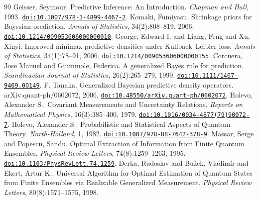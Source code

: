 \documentclass[journal]{IEEEtran}
\begin{document}
\begin{thebibliography}{99}
Geisser, Seymour.
\newblock Predictive Inference: An Introduction.
\newblock \emph{Chapman and Hall}, 1993.  
\newblock \href{https://doi.org/10.1007/978-1-4899-4467-2}{\texttt{doi:10.1007/978-1-4899-4467-2}}.  
Komaki, Fumiyasu.
\newblock Shrinkage priors for Bayesian prediction.
\newblock \emph{Annals of Statistics}, 34(2):808--819, 2006.  
\newblock \href{https://doi.org/10.1214/009053606000000010}{\texttt{doi:10.1214/009053606000000010}}.  
George, Edward I. and Liang, Feng and Xu, Xinyi.
\newblock Improved minimax predictive densities under Kullback--Leibler loss.
\newblock \emph{Annals of Statistics}, 34(1):78--91, 2006.  
\newblock \href{https://doi.org/10.1214/009053606000000155}{\texttt{doi:10.1214/009053606000000155}}.  
Corcuera, Jose Manuel and Giummole, Federica.
\newblock A generalized Bayes rule for prediction.
\newblock \emph{Scandinavian Journal of Statistics}, 26(2):265--279, 1999.  
\newblock \href{https://doi.org/10.1111/1467-9469.00149}{\texttt{doi:10.1111/1467-9469.00149}}.  
F. Tanaka.
\newblock Generalized Bayesian predictive density operators.
\newblock arXiv:quant-ph/0602072, 2006.  
\newblock \href{https://doi.org/10.48550/arXiv.quant-ph/0602072}{\texttt{doi:10.48550/arXiv.quant-ph/0602072}}.  
Holevo, Alexander S..
\newblock Covariant Measurements and Uncertainty Relations.
\newblock \emph{Reports on Mathematical Physics}, 16(3):385--400, 1979.  
\newblock \href{https://doi.org/10.1016/0034-4877(79)90072-7}{\texttt{doi:10.1016/0034-4877(79)90072-7}}.  
Holevo, Alexander S..
\newblock Probabilistic and Statistical Aspects of Quantum Theory.
\newblock \emph{North-Holland}, 1, 1982.  
\newblock \href{https://doi.org/10.1007/978-88-7642-378-9}{\texttt{doi:10.1007/978-88-7642-378-9}}.  
Massar, Serge and Popescu, Sandu.
\newblock Optimal Extraction of Information from Finite Quantum Ensembles.
\newblock \emph{Physical Review Letters}, 74(8):1259--1263, 1995.  
\newblock \href{https://doi.org/10.1103/PhysRevLett.74.1259}{\texttt{doi:10.1103/PhysRevLett.74.1259}}.  
Derka, Radoslav and Bu\v{z}ek, Vladim\'{i}r and Ekert, Artur K..
\newblock Universal Algorithm for Optimal Estimation of Quantum States from Finite Ensembles via Realizable Generalized Measurement.
\newblock \emph{Physical Review Letters}, 80(8):1571--1575, 1998.  

\end{thebibliography}
\end{document}
